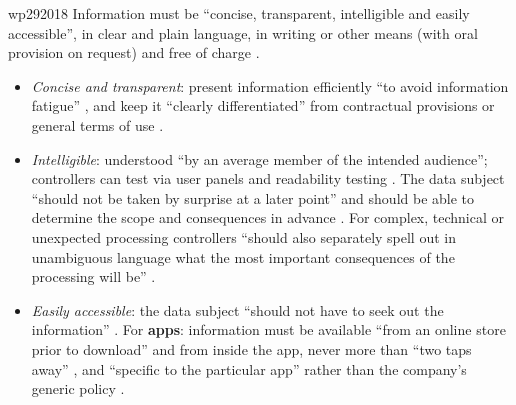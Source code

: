 \begin{papercard}{wp292018}
 Information must be ``concise, transparent, intelligible and easily accessible'', in clear and plain language, in writing or other means (with oral provision on request) and free of charge .
\begin{itemize}\itemsep0pt
\item \emph{Concise and transparent}: present information efficiently ``to avoid information fatigue'' , and keep it ``clearly differentiated'' from contractual provisions or general terms of use .
\item \emph{Intelligible}: understood ``by an average member of the intended audience''; controllers can test via user panels and readability testing . The data subject ``should not be taken by surprise at a later point'' and should be able to determine the scope and consequences in advance . For complex, technical or unexpected processing controllers ``should also separately spell out in unambiguous language what the most important consequences of the processing will be'' .
\item \emph{Easily accessible}: the data subject ``should not have to seek out the information'' . For \textbf{apps}: information must be available ``from an online store prior to download'' and from inside the app, never more than ``two taps away'' , and ``specific to the particular app'' rather than the company's generic policy .

\end{itemize}
\end{papercard}
